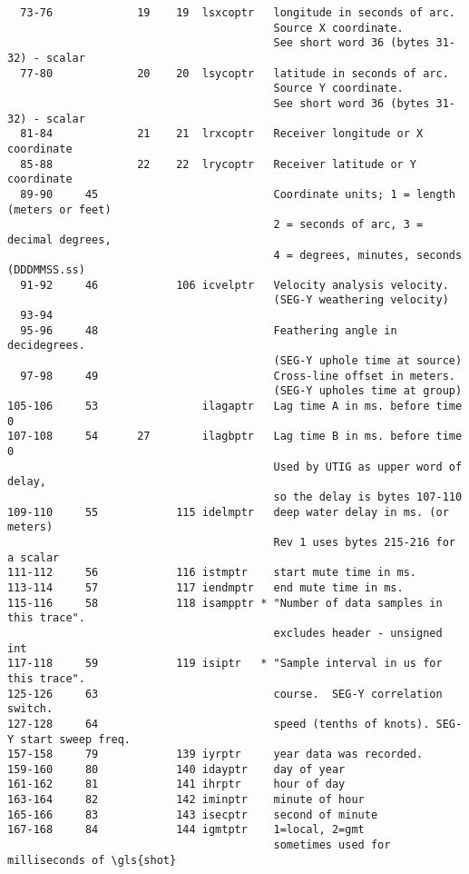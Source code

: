 \begin{verbatim}
  73-76             19    19  lsxcoptr   longitude in seconds of arc.
                                         Source X coordinate.
                                         See short word 36 (bytes 31-32) - scalar
  77-80             20    20  lsycoptr   latitude in seconds of arc.
                                         Source Y coordinate.
                                         See short word 36 (bytes 31-32) - scalar
  81-84             21    21  lrxcoptr   Receiver longitude or X coordinate
  85-88             22    22  lrycoptr   Receiver latitude or Y coordinate
  89-90     45                           Coordinate units; 1 = length (meters or feet)
                                         2 = seconds of arc, 3 = decimal degrees,
                                         4 = degrees, minutes, seconds (DDDMMSS.ss)
  91-92     46            106 icvelptr   Velocity analysis velocity.
                                         (SEG-Y weathering velocity)
  93-94
  95-96     48                           Feathering angle in decidegrees.
                                         (SEG-Y uphole time at source)
  97-98     49                           Cross-line offset in meters.
                                         (SEG-Y upholes time at group)
105-106     53                ilagaptr   Lag time A in ms. before time 0
107-108     54      27        ilagbptr   Lag time B in ms. before time 0
                                         Used by UTIG as upper word of delay,
                                         so the delay is bytes 107-110
109-110     55            115 idelmptr   deep water delay in ms. (or meters)
                                         Rev 1 uses bytes 215-216 for a scalar
111-112     56            116 istmptr    start mute time in ms.
113-114     57            117 iendmptr   end mute time in ms.
115-116     58            118 isampptr * "Number of data samples in this trace".
                                         excludes header - unsigned int
117-118     59            119 isiptr   * "Sample interval in us for this trace".
125-126     63                           course.  SEG-Y correlation switch.
127-128     64                           speed (tenths of knots). SEG-Y start sweep freq.
157-158     79            139 iyrptr     year data was recorded.
159-160     80            140 idayptr    day of year
161-162     81            141 ihrptr     hour of day
163-164     82            142 iminptr    minute of hour
165-166     83            143 isecptr    second of minute
167-168     84            144 igmtptr    1=local, 2=gmt
                                         sometimes used for milliseconds of \gls{shot}


\end{verbatim}
